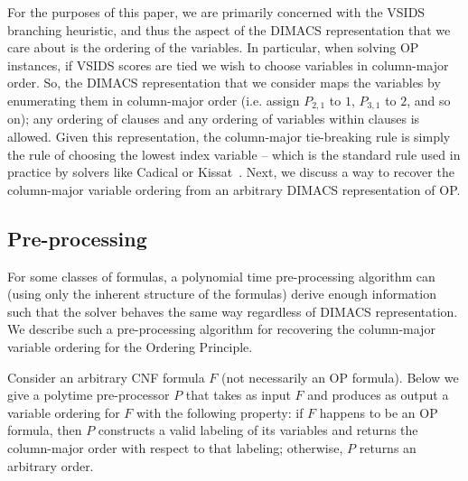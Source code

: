 \documentclass[10pt,a4paper]{article}
\begin{document}
For the purposes of this paper, we are primarily concerned with the VSIDS branching heuristic, and thus the aspect of the DIMACS representation that we care about is the ordering of the variables. In particular, when solving OP instances, if VSIDS scores are tied we wish to choose variables in column-major order. So, the DIMACS representation that we consider maps the variables by enumerating them in column-major order (i.e. assign $P_{2, 1}$ to $1$, $P_{3, 1}$ to $2$, and so on); any ordering of clauses and any ordering of variables within clauses is allowed. Given this representation, the column-major tie-breaking rule is simply the rule of choosing the lowest index variable -- which is the standard rule used in practice by solvers like Cadical or Kissat~\cite{DBLP:conf/sat/BiereF15}. 
Next, we discuss a way to recover the column-major variable ordering from an arbitrary DIMACS representation of OP.

\subsection{Pre-processing}
\label{sec:preprocessing}
For some classes of formulas, a polynomial time pre-processing algorithm can (using only the inherent structure of the formulas) derive enough information such that the solver behaves the same way regardless of DIMACS representation. We describe such a pre-processing algorithm for recovering the column-major variable ordering for the Ordering Principle.

Consider an arbitrary CNF formula $F$ (not necessarily an OP formula). Below we give a polytime pre-processor $P$ that takes as input $F$ and produces as output a variable ordering for $F$ with the following property: if $F$ happens to be an OP formula, then $P$ constructs a valid labeling of its variables and returns the column-major order with respect to that labeling; otherwise, $P$ returns an arbitrary order. 
\end{document}

